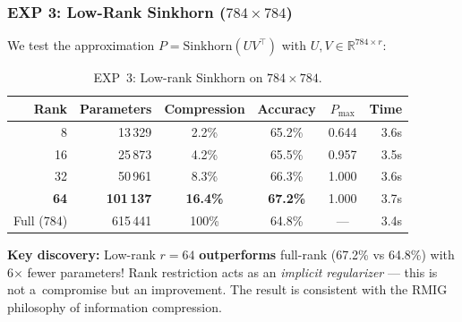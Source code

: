 \subsubsection*{EXP 3: Low-Rank Sinkhorn ($784 \times 784$)}

We test the approximation $P = \text{Sinkhorn}(UV^\top)$ with $U, V \in \mathbb{R}^{784 \times r}$:

\begin{table}[h]
\centering
\caption{EXP~3: Low-rank Sinkhorn on $784 \times 784$.}
\begin{tabular}{rrcccr}
\hline
\textbf{Rank} & \textbf{Parameters} & \textbf{Compression} & \textbf{Accuracy} & \textbf{$P_{\max}$} & \textbf{Time} \\
\hline
8   & 13\,329  & 2.2\%  & 65.2\% & 0.644 & 3.6s \\
16  & 25\,873  & 4.2\%  & 65.5\% & 0.957 & 3.5s \\
32  & 50\,961  & 8.3\%  & 66.3\% & 1.000 & 3.6s \\
\textbf{64} & \textbf{101\,137} & \textbf{16.4\%} & \textbf{67.2\%} & 1.000 & 3.7s \\
Full (784) & 615\,441 & 100\% & 64.8\% & --- & 3.4s \\
\hline
\end{tabular}
\end{table}

\textbf{Key discovery:} Low-rank $r=64$ \textbf{outperforms} full-rank (67.2\% vs 64.8\%) with 6$\times$ fewer parameters! Rank restriction acts as an \emph{implicit regularizer} --- this is not a~compromise but an improvement. The result is consistent with the RMIG philosophy of information compression.

